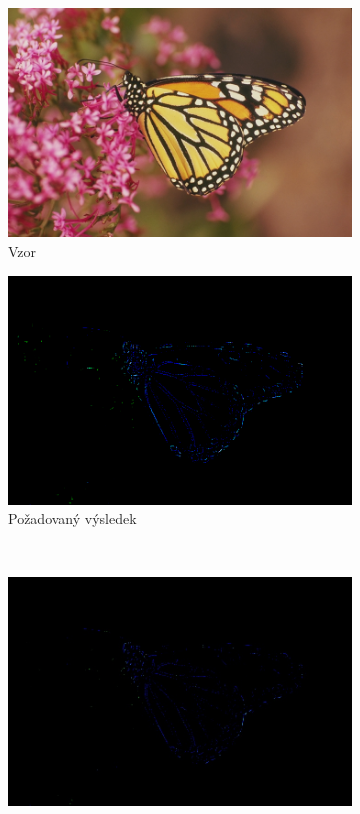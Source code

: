\documentclass[a4paper,11pt,titlepage]{scrartcl}
\begin{document}
\begin{figure}[!h]
    \centering
    \begin{subfigure}[b]{0.40\textwidth}
        \includegraphics[width=\textwidth]{img/example3.png}
        \caption{Vzor}
        \label{fig:gull}
    \end{subfigure}
    \begin{subfigure}[b]{0.40\textwidth}
        \includegraphics[width=\textwidth]{img/example3_E.png}
        \caption{Požadovaný výsledek}
        \label{fig:gull}
    \end{subfigure}
    \\
    \begin{subfigure}[b]{0.32\textwidth}
        \includegraphics[width=\textwidth]{img/tournament-blx_a-ssim-dynamic_example3.jpg}

\end{subfigure}
\end{figure}
\end{document}

